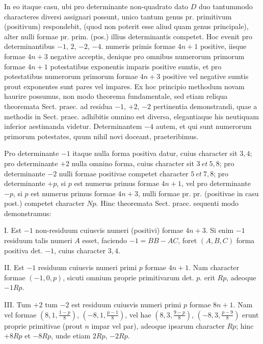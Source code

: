 In eo itaque casu, ubi pro determinante non-quadrato dato $D$ duo tantummodo
characteres diversi assignari possunt, unico tantum genus pr. primitivum
(positivum) respondebit, (quod non poterit esse aliud quam genus principale),
alter nulli formae pr. prim. (pos.) illius determinantis competet. Hoc evenit pro
determinantibus $-1$, $2$, $-2$, $-4$. numeris primis formae $4n+1$ positive, iisque
formae $4n+3$ negative acceptis, denique pro omnibus numerorum primorum
formae $4n+1$ potestatibus exponentis imparis positive sumtis, et pro potestatibus
numerorum primorum formae $4n+3$ positive vel negative sumtis prout
exponentes sunt pares vel impares. Ex hoc principio methodum novam haurire
possumus, non modo theorema fundamentale, sed etiam reliqua theoremata Sect.
praec. ad residua $-1$, $+2$, $-2$ pertinentia demonstrandi, quae a methodis in
Sect. praec. adhibitis omnino est diversa, elegantiaque his neutiquam inferior
aestimanda videtur. Determinantem $-4$ autem, et qui sunt numerorum primorum
potestates, quum nihil novi doceant, praeteribimus.

Pro determinante $-1$ itaque nulla forma positiva datur, cuius character sit
$3,4$; pro determinante $+2$ nulla omnino forma, cuius character sit $3\ \mathit{et}\ 5,8$;
pro determinante $-2$ nulli formae positivae competet character $5\ \mathit{et}\ 7,8$; pro
determinante $+p$, si $p$ est numerus primus formae $4n+1$, vel pro determinante
$-p$, si $p$ est numerus primus formae $4n+3$, nulli formae pr. pr. (positivae
in casu post.) competet character $Np$. Hinc theoremata Sect. praec. sequenti
modo demonstramus:

I. Est $-1$ non-residuum cuiusvis numeri (positivi) formae $4n+3$. Si
enim $-1$ residuum talis numeri $A$ esset, faciendo $-1=BB-AC$, foret
$(A,B,C)$ forma positiva det. $-1$, cuius character $3,4$.

II. Est $-1$ residuum cuiusvis numeri primi $p$ formae $4n+1$. Nam
character formae $(-1,0,p)$, sicuti omnium proprie primitivarum det. $p$. erit
$Rp$, adeoque $-1Rp$.

III. Tum $+2$ tum $-2$ est residuum cuiusvis numeri primi $p$ formae
$8n+1$. Nam vel formae $\left(8,\allowbreak 1,\allowbreak \frac{1-p}{8}\right)$, $\left(-8,\allowbreak 1,\allowbreak \frac{p-1}{8}\right)$, vel hae $\left(8,\allowbreak 3,\allowbreak \frac{9-p}{8}\right)$, $\left(-8,\allowbreak 3,\allowbreak \frac{p-9}{8}\right)$
erunt proprie primitivae (prout $n$ impar vel par), adeoque ipsarum character $Rp$;
hinc $+8Rp$ et $-8Rp$, unde etiam $2Rp$, $-2Rp$.

